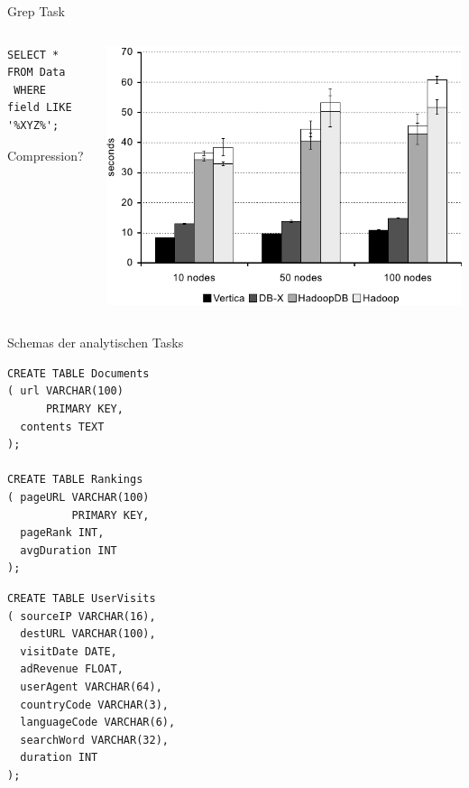 \documentclass{beamer}
\begin{document}
\begin{frame}[fragile]{Grep Task}
  \begin{columns}
    \begin{column}{0.3\textwidth}
\begin{verbatim}
SELECT * FROM Data
 WHERE
field LIKE '%XYZ%';
\end{verbatim} 
Compression?
    \end{column}
    \begin{column}{0.7\textwidth}
      \includegraphics[width=\textwidth]{../ausarbeitung/images/diagram_grep_task.png}
    \end{column}
  \end{columns}
\end{frame}

\begin{frame}[fragile]{Schemas der analytischen Tasks}
  \begin{multicols}{2}
\begin{verbatim}
CREATE TABLE Documents
( url VARCHAR(100) 
      PRIMARY KEY,
  contents TEXT 
);

CREATE TABLE Rankings 
( pageURL VARCHAR(100) 
          PRIMARY KEY,
  pageRank INT,
  avgDuration INT 
);
\end{verbatim}    

\begin{verbatim}
CREATE TABLE UserVisits
( sourceIP VARCHAR(16),
  destURL VARCHAR(100),
  visitDate DATE,
  adRevenue FLOAT,
  userAgent VARCHAR(64),
  countryCode VARCHAR(3),
  languageCode VARCHAR(6),
  searchWord VARCHAR(32),
  duration INT 
);
\end{verbatim}
  \end{multicols}
\end{frame}
\end{document}
